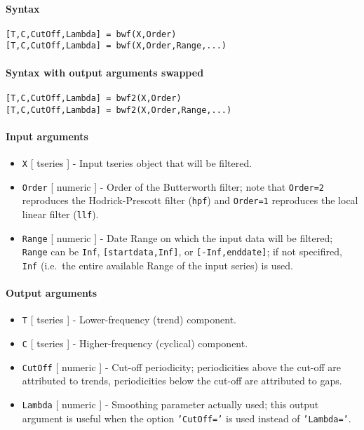 


	\paragraph{Syntax}\label{syntax}

\begin{verbatim}
[T,C,CutOff,Lambda] = bwf(X,Order)
[T,C,CutOff,Lambda] = bwf(X,Order,Range,...)
\end{verbatim}

\paragraph{Syntax with output arguments
swapped}\label{syntax-with-output-arguments-swapped}

\begin{verbatim}
[T,C,CutOff,Lambda] = bwf2(X,Order)
[T,C,CutOff,Lambda] = bwf2(X,Order,Range,...)
\end{verbatim}

\paragraph{Input arguments}\label{input-arguments}

\begin{itemize}
\item
  \texttt{X} {[} tseries {]} - Input tseries object that will be
  filtered.
\item
  \texttt{Order} {[} numeric {]} - Order of the Butterworth filter; note
  that \texttt{Order=2} reproduces the Hodrick-Prescott filter
  (\texttt{hpf}) and \texttt{Order=1} reproduces the local linear filter
  (\texttt{llf}).
\item
  \texttt{Range} {[} numeric {]} - Date Range on which the input data
  will be filtered; \texttt{Range} can be \texttt{Inf},
  \texttt{{[}startdata,Inf{]}}, or \texttt{{[}-Inf,enddate{]}}; if not
  specifired, \texttt{Inf} (i.e.~the entire available Range of the input
  series) is used.
\end{itemize}

\paragraph{Output arguments}\label{output-arguments}

\begin{itemize}
\item
  \texttt{T} {[} tseries {]} - Lower-frequency (trend) component.
\item
  \texttt{C} {[} tseries {]} - Higher-frequency (cyclical) component.
\item
  \texttt{CutOff} {[} numeric {]} - Cut-off periodicity; periodicities
  above the cut-off are attributed to trends, periodicities below the
  cut-off are attributed to gaps.
\item
  \texttt{Lambda} {[} numeric {]} - Smoothing parameter actually used;
  this output argument is useful when the option \texttt{'CutOff='} is
  used instead of \texttt{'Lambda='}.
\end{itemize}

